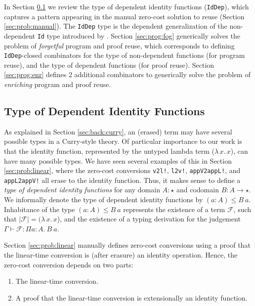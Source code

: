 \documentclass[acmsmall]{acmart}\settopmatter{}
\newcommand{\refsec}[1]{Section \ref{sec:#1}}
\newcommand{\labsec}[1]{\label{sec:#1}}
\newcommand{\lam}[2]{\lambda\, #1.\, #2}
\begin{document}
In \refsec{prog:id} we review the type of dependent identity
functions (\verb;IdDep;), which captures a pattern appearing in the
manual zero-cost solution to reuse (\refsec{prob:manual}).
The \verb;IdDep; type is the dependent generalization of the
non-dependent \verb;Id; type introduced by \citet{firsov18b}.
\refsec{prog:fog} generically solves the
problem of \textit{forgetful} program and proof reuse, which corresponds to
defining \verb;IdDep;-closed combinators for
the type of non-dependent functions (for program reuse), and
the type of dependent functions (for proof reuse).
\refsec{prog:enr} defines 2 additional combinators to generically solve the
problem of \textit{enriching} program and proof reuse.

\subsection{Type of Dependent Identity Functions}
\labsec{prog:id}

As explained in \refsec{back:curry}, an (erased) term may have several
possible types in a Curry-style theory. Of particular importance to
our work is that the identity function, represented by the untyped
lambda term ($\lam{x}{x}$), can have many possible types. We have seen
several examples of this in \refsec{prob:linear}, where the zero-cost
conversions \verb;v2l!;, \verb;l2v!;, \verb;appV2appL!;, and
\verb;appL2appV!; all erase to the identity function. Thus, it makes
sense to define a \textit{type of dependent identity functions} for any domain
$A : \star$ and codomain $B : A \rightarrow \star$.
We informally denote the
type of dependent identity functions by $(a : A) \leq B~a$.
Inhabitance of the type $(a : A) \leq B~a$ represents
the existence of a term $\mathcal{F}$, such that
$|\mathcal{F}|=(\lam{x}{x}$), and the existence of a typing derivation
for the judgement $\Gamma\vdash \mathcal{F} : \Pi a : A.~B~a$.

\refsec{prob:linear} manually defines zero-cost conversions
using a proof that the linear-time conversion is (after erasure)
an identity operation. Hence, the zero-cost conversion depends on two parts:
\begin{enumerate}
\item The linear-time conversion.
\item A proof that the linear-time conversion is extensionally an
  identity function. 
\end{enumerate}
\end{document}
